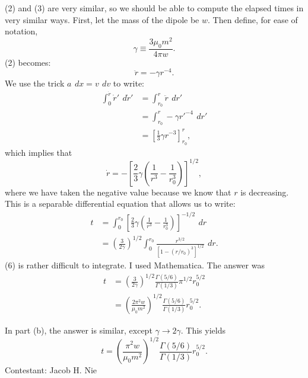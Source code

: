 \documentclass[12pt]{article}
\newcommand{\diff}{\,\textit{d}}
\begin{document}
(2) and (3) are very similar, so we should be able to compute the elapsed times in very similar ways.  First, let the mass of the dipole be $w.$  Then define, for ease of notation,
\[
	\gamma \equiv \frac{3 \mu_0 m^2}{4 \pi w}.
\]
(2) becomes:
\begin{equation}
	\ddot{r} = -\gamma r^{-4}.
\end{equation}
We use the trick $a\ \diff x = v \ \diff v$ to write:
\begin{align*}
	\int_{0}^{\dot{r}} \dot{r}' \ \diff \dot{r} ' &= \int _{r_0}^{r} \ddot{r} \ \diff r' \\
						      &= \int_{r_0} ^{r} - \gamma r'^{-4} \ \diff r' \\
						      &= \left[ \frac{1}{3}\gamma r^{-3} \right]_{r_0}^r,
\end{align*}
which implies that
\begin{equation}
	\dot{r} = -\left[ \frac{2}{3}\gamma\left( \frac{1}{r^3} - \frac{1}{r_0^3} \right) \right]^{1/2},
\end{equation}
where we have taken the negative value because we know that $r$ is decreasing.  This is a separable differential equation that allows us to write:
\begin{align}
	t &= \int_0^{r_0} \left[ \frac{2}{3}\gamma\left( \frac{1}{r^3} - \frac{1}{r_0^3} \right) \right]^{-1/2} \ \diff r \nonumber \\
	  &= \left( \frac{3}{2\gamma} \right)^{1/2} \int_0^{r_0} \frac{r^{3/2}}{\left[1-(r/r_0)^3\right]^{1/2}} \ \diff r.
\end{align}
(6) is rather difficult to integrate.  I used Mathematica.  The answer was
\begin{align}
	t &= \left( \frac{3}{2\gamma} \right)^{1/2} \frac{\Gamma(5/6)}{\Gamma(1/3)} \pi^{1/2} r_0^{5/2} \nonumber \\
	  &= \left( \frac{2\pi^2 w}{\mu_0 m^2} \right) ^{1/2} \frac{\Gamma(5/6)}{\Gamma(1/3)} r_0^{5/2}.
\end{align}

In part (b), the answer is similar, except $\gamma \to 2\gamma$.  This yields
\begin{equation}
	t = \left( \frac{\pi^2 w}{\mu_0 m^2} \right) ^{1/2} \frac{\Gamma(5/6)}{\Gamma(1/3)} r_0^{5/2}.
\end{equation}
\vspace{1cm}
\hfill Contestant: Jacob H. Nie
\end{document}
